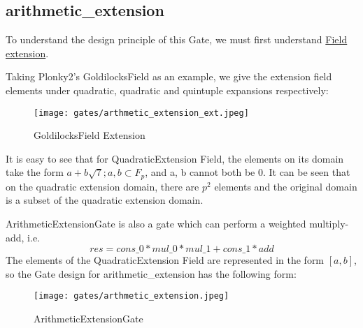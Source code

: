 \subsection{arithmetic\_extension}

To understand the design principle of this Gate, we must first understand \href{https://en.wikipedia.org/wiki/Field_extension#Extension_field}{Field extension}. 


Taking Plonky2's GoldilocksField as an example, we give the extension field elements under quadratic, quadratic and quintuple expansions respectively:

\begin{figure}[!h]
    \centering
    \texttt{[image: gates/arthmetic\_extension\_ext.jpeg]}
    \caption{GoldilocksField Extension}
    \label{fig:goldilocksfield-extension}
\end{figure}

It is easy to see that for QuadraticExtension Field, the elements on its domain take the form $a + b \sqrt{7}; a,b \subset F_p$, and a, b cannot both be 0.
It can be seen that on the quadratic extension domain, there are $p^2$ elements and the original domain is a subset of the quadratic extension domain.

ArithmeticExtensionGate is also a gate which can perform a weighted multiply-add, i.e.
\[res = cons\_0 * mul\_0 * mul\_1 + cons\_1 * add\]
The elements of the QuadraticExtension Field are represented in the form $[a, b]$, so the Gate design for arithmetic\_extension has the following form:

\begin{figure}[!ht]
    \centering
    \texttt{[image: gates/arthmetic\_extension.jpeg]}
    \caption{ArithmeticExtensionGate}
    \label{fig:arthmetic-extension}
\end{figure}